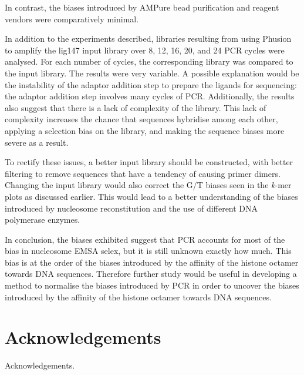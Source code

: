 \documentclass[parskip=full, numbers=noenddot]{scrreprt}
\begin{document}
In contrast, the biases introduced by AMPure bead purification and reagent vendors were comparatively minimal.

In addition to the experiments described, libraries resulting from using Phusion to amplify the lig147 input library over 8, 12, 16, 20, and 24 PCR cycles were analysed.  For each number of cycles, the corresponding library was compared to the input library.  The results were very variable.  %
A possible explanation would be the instability of the adaptor addition step to prepare the ligands for sequencing: the adaptor addition step involves many cycles of PCR.  Additionally, the results also suggest that there is a lack of complexity of the library.  This lack of complexity increases the chance that sequences hybridise among each other, applying a selection bias on the library, and making the sequence biases more severe as a result.

To rectify these issues, a better input library should be constructed, with better filtering to remove sequences that have a tendency of causing primer dimers.  Changing the input library would also correct the G/T biases seen in the \emph{k}-mer plots as discussed earlier.  This would lead to a better understanding of the biases introduced by nucleosome reconstitution and the use of different DNA polymerase enzymes.

In conclusion, the biases exhibited suggest that PCR accounts for most of the bias in nucleosome EMSA selex, but it is still unknown exactly how much.  This bias is at the order of the biases introduced by the affinity of the histone octamer towards DNA sequences.  Therefore further study would be useful in developing a method to normalise the biases introduced by PCR in order to uncover the biases introduced by the affinity of the histone octamer towards DNA sequences.

\chapter{Acknowledgements}
\label{ch:ack}

Acknowledgements.

\printbibliography
\end{document}
